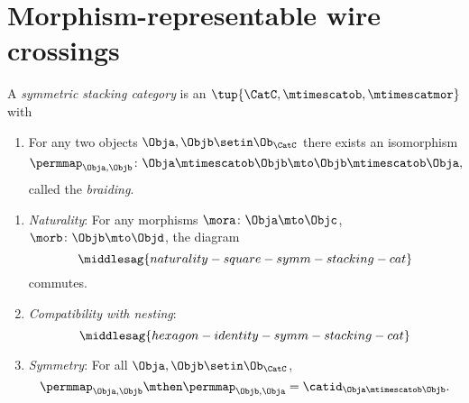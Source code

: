 
\section{Morphism-representable wire crossings}
\label{sec:symmetric-stacking-categories}



\begin{ctdefinition}
    \label{def:sym-stacking-cat}
    A \emph{symmetric stacking category} is an  $\tup{\CatC, \mtimescatob, \mtimescatmor}$ with

    \constit

    \begin{enumerate}
        \item For any two objects $\Obja, \Objb \setin \Ob_\CatC$ there exists an isomorphism
              \begin{equation}
                  \permmap_{\Obja, \Objb} \colon \Obja \mtimescatob \Objb \mto \Objb \mtimescatob \Obja,
              \end{equation}
              called the \emph{braiding}.
    \end{enumerate}

    \condit

    \begin{enumerate}
        \item \emph{Naturality}: For any morphisms $\mora \colon \Obja \mto \Objc$, $\morb \colon \Objb \mto \Objd$, the diagram
              \begin{equation}\label{eq:naturality-square-symm-stacking-cat}
                  \middlesag{naturality-square-symm-stacking-cat}
              \end{equation}
              commutes.
        \item \emph{Compatibility with nesting}:
              \begin{equation}\label{eq:hexagon-identity-symm-stacking-cat}
                  \middlesag{hexagon-identity-symm-stacking-cat}
              \end{equation}

        \item \emph{Symmetry}: For all $\Obja, \Objb \setin \Ob_\CatC$,
              \begin{equation}
                  \permmap_{\Obja, \Objb} \mthen \permmap_{\Objb, \Obja} = \catid_{\Obja \mtimescatob \Objb}.
              \end{equation}
    \end{enumerate}

\end{ctdefinition}

